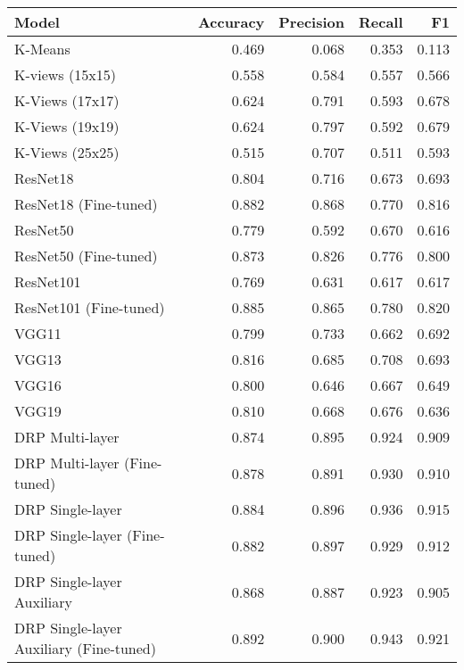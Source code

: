 \begin{tabular}{lrrrr}
    \toprule
    Model                                   & Accuracy & Precision & Recall & F1    \\
    \midrule
    K-Means                                 & 0.469    & 0.068     & 0.353  & 0.113 \\
    K-views (15x15)                         & 0.558    & 0.584     & 0.557  & 0.566 \\
    K-Views (17x17)                         & 0.624    & 0.791     & 0.593  & 0.678 \\
    K-Views (19x19)                         & 0.624    & 0.797     & 0.592  & 0.679 \\
    K-Views (25x25)                         & 0.515    & 0.707     & 0.511  & 0.593 \\
    ResNet18                                & 0.804    & 0.716     & 0.673  & 0.693 \\
    ResNet18 (Fine-tuned)                   & 0.882    & 0.868     & 0.770  & 0.816 \\
    ResNet50                                & 0.779    & 0.592     & 0.670  & 0.616 \\
    ResNet50 (Fine-tuned)                   & 0.873    & 0.826     & 0.776  & 0.800 \\
    ResNet101                               & 0.769    & 0.631     & 0.617  & 0.617 \\
    ResNet101 (Fine-tuned)                  & 0.885    & 0.865     & 0.780  & 0.820 \\
    VGG11                                   & 0.799    & 0.733     & 0.662  & 0.692 \\
    VGG13                                   & 0.816    & 0.685     & 0.708  & 0.693 \\
    VGG16                                   & 0.800    & 0.646     & 0.667  & 0.649 \\
    VGG19                                   & 0.810    & 0.668     & 0.676  & 0.636 \\
    DRP Multi-layer                         & 0.874    & 0.895     & 0.924  & 0.909 \\
    DRP Multi-layer (Fine-tuned)            & 0.878    & 0.891     & 0.930  & 0.910 \\
    DRP Single-layer                        & 0.884    & 0.896     & 0.936  & 0.915 \\
    DRP Single-layer (Fine-tuned)           & 0.882    & 0.897     & 0.929  & 0.912 \\
    DRP Single-layer Auxiliary              & 0.868    & 0.887     & 0.923  & 0.905 \\
    DRP Single-layer Auxiliary (Fine-tuned) & 0.892    & 0.900     & 0.943  & 0.921 \\
    \bottomrule
\end{tabular}
